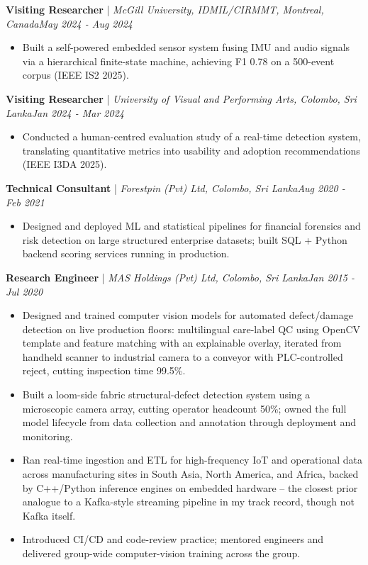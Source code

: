 \documentclass[11pt]{article}
\newenvironment{cvrole}[5]{%
  \par\noindent\textbf{\large #1} | \textit{\small #2, #3}\hfill \textit{\small #4 - #5}\par
  \begin{itemize}[leftmargin=2em, itemsep=-0.3em, topsep=-0.5em]%
}{%
  \end{itemize}\par\noindent\mbox{}\par\vspace{0.1em}%
}
\begin{document}
\begin{cvrole}{Visiting Researcher}{McGill University, IDMIL/CIRMMT}{Montreal, Canada}{May 2024}{Aug 2024}
\item Built a self-powered embedded sensor system fusing IMU and audio signals via a hierarchical finite-state machine, achieving F1 0.78 on a 500-event corpus (IEEE IS2 2025).
\end{cvrole}

\begin{cvrole}{Visiting Researcher}{University of Visual and Performing Arts}{Colombo, Sri Lanka}{Jan 2024}{Mar 2024}
\item Conducted a human-centred evaluation study of a real-time detection system, translating quantitative metrics into usability and adoption recommendations (IEEE I3DA 2025).
\end{cvrole}

\begin{cvrole}{Technical Consultant}{Forestpin (Pvt) Ltd}{Colombo, Sri Lanka}{Aug 2020}{Feb 2021}
\item Designed and deployed ML and statistical pipelines for financial forensics and risk detection on large structured enterprise datasets; built SQL + Python backend scoring services running in production.
\end{cvrole}

\begin{cvrole}{Research Engineer}{MAS Holdings (Pvt) Ltd}{Colombo, Sri Lanka}{Jan 2015}{Jul 2020}
\item Designed and trained computer vision models for automated defect/damage detection on live production floors: multilingual care-label QC using OpenCV template and feature matching with an explainable overlay, iterated from handheld scanner to industrial camera to a conveyor with PLC-controlled reject, cutting inspection time 99.5\%.
\item Built a loom-side fabric structural-defect detection system using a microscopic camera array, cutting operator headcount 50\%; owned the full model lifecycle from data collection and annotation through deployment and monitoring.
\item Ran real-time ingestion and ETL for high-frequency IoT and operational data across manufacturing sites in South Asia, North America, and Africa, backed by C++/Python inference engines on embedded hardware -- the closest prior analogue to a Kafka-style streaming pipeline in my track record, though not Kafka itself.
\item Introduced CI/CD and code-review practice; mentored engineers and delivered group-wide computer-vision training across the group.
\end{cvrole}
\end{document}
